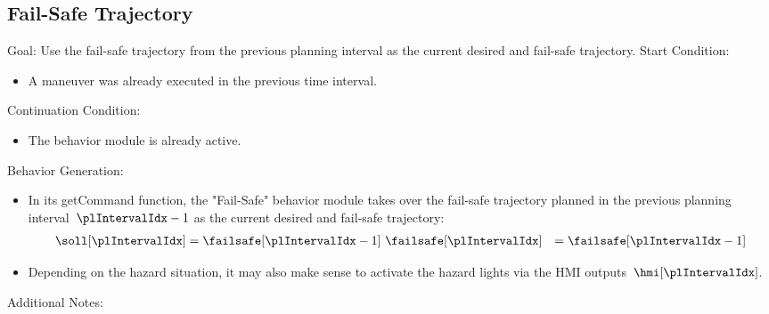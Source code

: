 \subsection{Fail-Safe Trajectory}

    Goal: Use the fail-safe trajectory from the previous planning interval as the current desired and fail-safe trajectory.
    Start Condition:

\begin{itemize}
    \item A maneuver was already executed in the previous time interval.
\end{itemize}

    Continuation Condition:

\begin{itemize}
    \item The behavior module is already active.
\end{itemize}

    Behavior Generation:

\begin{itemize}
    \item In its getCommand function, the "Fail-Safe" behavior module takes over the fail-safe trajectory planned in the previous planning interval~$\plIntervalIdx-1$ as the current desired and fail-safe trajectory: \begin{subequations} \begin{align} \soll[\plIntervalIdx] &= \failsafe[\plIntervalIdx-1]\ \failsafe[\plIntervalIdx] &= \failsafe[\plIntervalIdx-1] \end{align} \end{subequations}
    \item Depending on the hazard situation, it may also make sense to activate the hazard lights via the HMI outputs~$\hmi[\plIntervalIdx]$.
\end{itemize}

Additional Notes:

